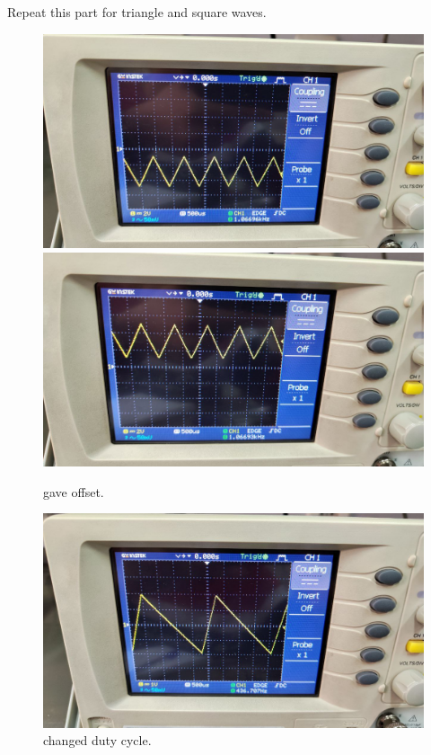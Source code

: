 \documentclass[11pt]{article}
\newcommand{\PicScale}{0.2}
\begin{document}
\begin{question}
\begin{subquestion}{Repeat this part for triangle and square waves.}
{    \begin{figure}[H]
        \begin{center}
            \includegraphics[scale=0.1]{Fig/10.jpeg}
            \includegraphics[scale=0.1]{Fig/11.jpeg}
            \caption{gave offset.}
        \end{center}
    \end{figure}

    \begin{figure}[H]
        \begin{center}
            \includegraphics[scale=\PicScale]{Fig/12.jpeg}
            \caption{changed duty cycle.}
        \end{center}
    \end{figure}

}
\end{subquestion}
\end{question}
\end{document}
